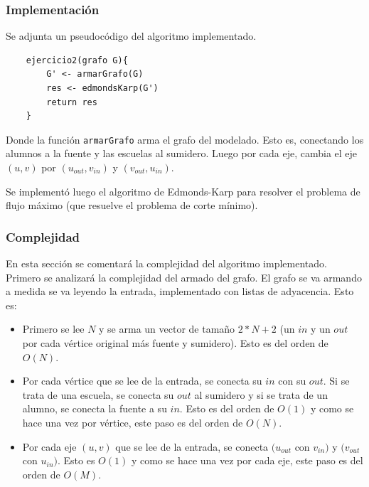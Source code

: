

\subsubsection{Implementación}

Se adjunta un pseudocódigo del algoritmo implementado.

\begin{verbatim}
    ejercicio2(grafo G){
        G' <- armarGrafo(G)
        res <- edmondsKarp(G')
        return res
    }
\end{verbatim}

Donde la función \texttt{armarGrafo} arma el grafo del modelado. Esto es, conectando los alumnos a la fuente y las escuelas al sumidero. Luego por cada eje, cambia el eje $(u,v)$ por $(u_{out}, v_{in})$ y $(v_{out}, u_{in})$.

Se implementó luego el algoritmo de Edmonds-Karp para resolver el problema de flujo máximo (que resuelve el problema de corte mínimo).



\subsubsection{Complejidad}

En esta sección se comentará la complejidad del algoritmo implementado. Primero se analizará la complejidad del armado del grafo. El grafo se va armando a medida se va leyendo la entrada, implementado con listas de adyacencia. Esto es:

\begin{itemize}
\item Primero se lee $N$ y se arma un vector de tamaño $2*N + 2$ (un $in$ y un $out$ por cada vértice original más fuente y sumidero). Esto es del orden de $O(N)$.
\item Por cada vértice que se lee de la entrada, se conecta su $in$ con su $out$. Si se trata de una escuela, se conecta su $out$ al sumidero y si se trata de un alumno, se conecta la fuente a su $in$. Esto es del orden de $O(1)$ y como se hace una vez por vértice, este paso es del orden de $O(N)$.
\item Por cada eje $(u,v)$ que se lee de la entrada, se conecta $(u_{out}$ con $v_{in})$ y $(v_{out}$ con $u_{in})$. Esto es $O(1)$ y como se hace una vez por cada eje, este paso es del orden de $O(M)$.
\end{itemize}

